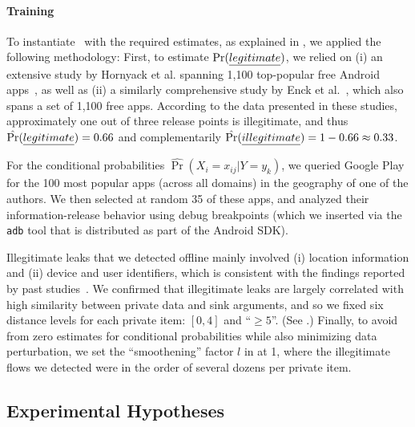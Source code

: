 \paragraph{Training} To instantiate \Tool\ with the required estimates, as explained in , we applied the following methodology:
%
First, to estimate $\Pr(\emph{legitimate})$, we relied on (i) an extensive study by Hornyack et al. spanning 1,100 top-popular free Android apps~\cite{HHJSW:CCS11}, as well as (ii) a similarly comprehensive study by Enck et al.~\cite{EOMC:SEC11}, which also spans a set of 1,100 free apps. According to the data presented in these studies, approximately one out of three release points is illegitimate, and thus $\hat{\Pr}(\emph{legitimate})=0.66$ and complementarily 
$\hat{\Pr}(\emph{illegitimate}) = 1-0.66 \approx 0.33$.

For the conditional probabilities $\hat{\Pr}(X_i = x_{ij} | Y=y_k)$,  we queried Google Play for the 100 most popular apps (across all domains) in the geography of one of the authors. We then selected at random 35 of these apps, and analyzed their information-release behavior using debug breakpoints 
(which we inserted via the {\tt adb} tool that is distributed as part of the Android SDK). 

Illegitimate leaks that we detected offline mainly involved (i) location information and (ii) device and user identifiers, which is consistent with the findings reported by past studies~\cite{HHJSW:CCS11,EOMC:SEC11}. We confirmed that illegitimate leaks are largely correlated with high similarity between private data and sink arguments, and so we fixed six distance levels for each private item: $[0,4]$ and ``$\geq 5$''. (See .) Finally, to avoid from zero estimates for conditional probabilities while also minimizing data perturbation, we set the ``smoothening'' factor $l$ in  at 1, where the illegitimate flows we detected were in the order of several dozens per private item. 

\subsection{Experimental Hypotheses}


